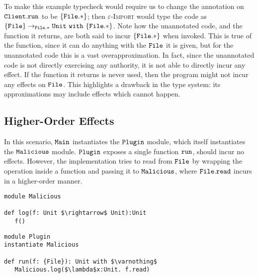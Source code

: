 To make this example typecheck would require us to change the annotation on $\mathtt{Client.run}$ to be $\mathtt{ \{ File.* \}}$; then \textsc{$\varepsilon$-Import} would type the code as $\mathtt{ \{ File \} \rightarrow_{\mathtt{File.*}}  \mathtt{Unit} ~\mathtt{with}~ \{ File.* \}}$. Note how the unannotated code, and the function it returns, are both said to incur $\{ \mathtt{File.*} \}$ when invoked. This is true of the function, since it can do anything with the $\mathtt{File}$ it is given, but for the unannotated code this is a vast overapproximation. In fact, since the unannotated code is not directly exercising any authority, it is not able to directly incur any effect. If the function it returns is never used, then the program might not incur any effects on $\mathtt{File}$. This highlights a drawback in the type system: its approximations may include effects which cannot happen.































\subsection{Higher-Order Effects}

In this scenario, $\mathtt{Main}$ instantiates the $\mathtt{Plugin}$ module, which itself instantiates the $\mathtt{Malicious}$ module. $\mathtt{Plugin}$ exposes a single function $\mathtt{run}$, should incur no effects. However, the implementation tries to read from $\mathtt{File}$ by wrapping the operation inside a function and passing it to $\mathtt{Malicious}$, where $\mathtt{File.read}$ incurs in a higher-order manner.

\begin{lstlisting}
module Malicious

def log(f: Unit $\rightarrow$ Unit):Unit
   f()
\end{lstlisting}

\begin{lstlisting}
module Plugin
instantiate Malicious

def run(f: {File}): Unit with $\varnothing$
   Malicious.log($\lambda$x:Unit. f.read)
\end{lstlisting}


